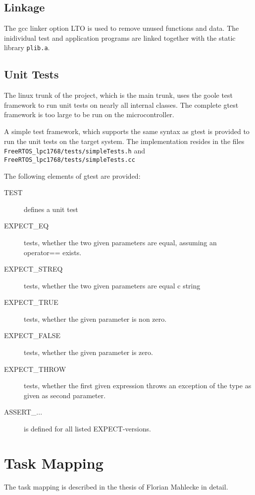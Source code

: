 \subsection{Linkage}
The gcc linker option LTO is used to remove unused functions and data. 
The inidividual test and application programs are linked together with 
the static library \verb|plib.a|.

\subsection{Unit Tests}
The linux trunk of the project, which is the main trunk, uses the
goole test framework to run unit tests on nearly all internal classes.
The complete gtest framework is too large to be run on the microcontroller.

A simple test framework, which supports the same syntax as gtest is provided
to run the unit tests on the target system.
The implementation resides in the files
 \verb|FreeRTOS_lpc1768/tests/simpleTests.h| and 
 \verb|FreeRTOS_lpc1768/tests/simpleTests.cc| 

The following elements of gtest are provided:
\begin{description}
\item[TEST] defines a unit test
\item[EXPECT\_EQ] tests, whether the two given parameters are equal, 
   assuming an operator== exists.
\item[EXPECT\_STREQ] tests, whether the two given parameters are equal c string 
\item[EXPECT\_TRUE] tests, whether the  given parameter is non zero. 
\item[EXPECT\_FALSE] tests, whether the  given parameter is zero. 
\item[EXPECT\_THROW] tests, whether the first given expression throws
   an exception of the type as given as  second parameter.
\item[ASSERT\_...] is defined for all listed EXPECT-versions. 
\end{description}

\section{Task Mapping}

The task mapping is described in the thesis of Florian Mahlecke in detail.

